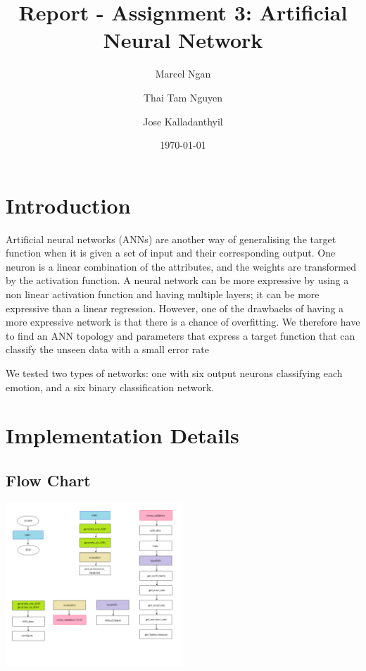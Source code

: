 \documentclass[a4wide, 11pt]{article}
\begin{document}
\title{Report - Assignment 3: Artificial Neural Network}

\author{Marcel Ngan \and Thai Tam Nguyen \and Jose Kalladanthyil}

\date{\today}         %

\maketitle            %

\section{Introduction}
Artificial neural networks (ANNs) are another way of generalising the target function when it is given a set of input and their corresponding output. One neuron is a linear combination of the attributes, and the weights are transformed by the activation function. A neural network can be more expressive by using a non linear activation function and having multiple layers; it can be more expressive than a linear regression. However, one of the drawbacks of having a more expressive network is that there is a chance of overfitting. We therefore have to find an ANN topology and parameters that express a target function that can classify the unseen data with a small error rate

We tested two types of networks: one with six output neurons classifying each emotion, and a six binary classification network.

\section{Implementation Details}

\subsection{Flow Chart}
\begin{center}
\includegraphics[width=0.5\textwidth]{flowchart.png}
\end{center}
\end{document}
